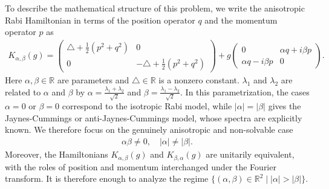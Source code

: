 \documentclass[12pt,dvipdfmx]{article}
\newcommand{\RR}{\mathbb{R}}
\begin{document}
To describe the mathematical structure of this problem, we write the anisotropic Rabi Hamiltonian in terms of the position operator $q$ and the momentum operator $p$ as
\begin{align*}
    K_{\alpha,\beta}(g)
    =
    \begin{pmatrix}
        \triangle+\frac12 (p^2 + q^2) & 0\\
        0 & - \triangle+\frac12 (p^2 + q^2)
    \end{pmatrix}
    +
    g
    \begin{pmatrix}
        0 & \alpha q + i\beta p\\
        \alpha q - i\beta p & 0
    \end{pmatrix}. 
\end{align*}
Here $\alpha,\beta\in\RR$ are parameters and $\triangle\in\RR$ is a nonzero constant.
$\lambda_1$ and $\lambda_2$ are related to $\alpha$ and $\beta$ by 
$\alpha=\frac{\lambda_1+\lambda_2}{\sqrt2}$ and 
$\beta=\frac{\lambda_1-\lambda_2}{\sqrt2}$. 
In this parametrization, the cases $\alpha=0$ or $\beta=0$ correspond to the isotropic Rabi model, while $|\alpha|=|\beta|$ gives the Jaynes-Cummings or anti-Jaynes-Cummings model, whose spectra are explicitly known. We therefore focus on the genuinely anisotropic and non-solvable case
\begin{align*}
    \alpha\beta \neq 0,
    \quad
    |\alpha| \neq |\beta|.
\end{align*}
Moreover, the Hamiltonians $K_{\alpha,\beta}(g)$ and $K_{\beta,\alpha}(g)$ are unitarily equivalent, with the roles of position and momentum interchanged under the Fourier transform. It is therefore enough to analyze the regime $\{(\alpha,\beta)\in\RR^2\mid |\alpha|>|\beta|\}$.
\end{document}
